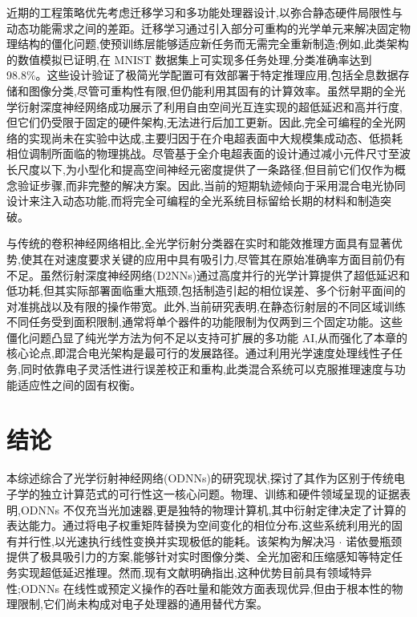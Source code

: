 \documentclass[11pt]{article}
\begin{document}
近期的工程策略优先考虑迁移学习和多功能处理器设计,以弥合静态硬件局限性与动态功能需求之间的差距。迁移学习通过引入部分可重构的光学单元来解决固定物理结构的僵化问题,使预训练层能够适应新任务而无需完全重新制造;例如,此类架构的数值模拟已证明,在 MNIST 数据集上可实现多任务处理,分类准确率达到 98.8\%。这些设计验证了极简光学配置可有效部署于特定推理应用,包括全息数据存储和图像分类,尽管可重构性有限,但仍能利用其固有的计算效率。虽然早期的全光学衍射深度神经网络成功展示了利用自由空间光互连实现的超低延迟和高并行度,但它们仍受限于固定的硬件架构,无法进行后加工更新。因此,完全可编程的全光网络的实现尚未在实验中达成,主要归因于在介电超表面中大规模集成动态、低损耗相位调制所面临的物理挑战。尽管基于全介电超表面的设计通过减小元件尺寸至波长尺度以下,为小型化和提高空间神经元密度提供了一条路径,但目前它们仅作为概念验证步骤,而非完整的解决方案。因此,当前的短期轨迹倾向于采用混合电光协同设计来注入动态功能,而将完全可编程的全光系统目标留给长期的材料和制造突破。\citep{doi_10_1117_12_3109287_f4650a31} \citep{doi_10_3390_photonics11020145_68f5de58} \citep{doi_10_1364_josab_497148_b087424b} \citep{doi_10_1117_12_2688132_926a2697}

与传统的卷积神经网络相比,全光学衍射分类器在实时和能效推理方面具有显著优势,使其在对速度要求关键的应用中具有吸引力,尽管其在原始准确率方面目前仍有不足。虽然衍射深度神经网络(D2NNs)通过高度并行的光学计算提供了超低延迟和低功耗,但其实际部署面临重大瓶颈,包括制造引起的相位误差、多个衍射平面间的对准挑战以及有限的操作带宽。此外,当前研究表明,在静态衍射层的不同区域训练不同任务受到面积限制,通常将单个器件的功能限制为仅两到三个固定功能。这些僵化问题凸显了纯光学方法为何不足以支持可扩展的多功能 AI,从而强化了本章的核心论点,即混合电光架构是最可行的发展路径。通过利用光学速度处理线性子任务,同时依靠电子灵活性进行误差校正和重构,此类混合系统可以克服推理速度与功能适应性之间的固有权衡。\citep{doi_10_1364_ol_593231_ab93febc} \citep{doi_10_1364_oe_598903_731aaac1} \citep{doi_10_48550_arxiv_2411_05748_a91b6f61}

\section{结论}\label{ux7ed3ux8bba}

本综述综合了光学衍射神经网络(ODNNs)的研究现状,探讨了其作为区别于传统电子学的独立计算范式的可行性这一核心问题。物理、训练和硬件领域呈现的证据表明,ODNNs 不仅充当光加速器,更是独特的物理计算机,其中衍射定律决定了计算的表达能力。通过将电子权重矩阵替换为空间变化的相位分布,这些系统利用光的固有并行性,以光速执行线性变换并实现极低的能耗。该架构为解决冯 \(\cdot\) 诺依曼瓶颈提供了极具吸引力的方案,能够针对实时图像分类、全光加密和压缩感知等特定任务实现超低延迟推理。然而,现有文献明确指出,这种优势目前具有领域特异性;ODNNs 在线性或预定义操作的吞吐量和能效方面表现优异,但由于根本性的物理限制,它们尚未构成对电子处理器的通用替代方案。
\end{document}
